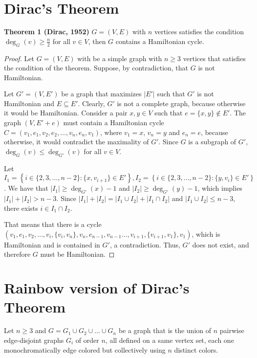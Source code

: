 \section{Dirac's Theorem}

\textbf{Theorem 1 (Dirac, 1952)} $G = (V, E)$ with $n$ vertices satisfies the condition $\deg_G(v) \geq \frac{n}{2}$ for all $v \in V$, 
then $G$ contains a Hamiltonian cycle.

\begin{proof}
    Let $G = (V, E)$ with be a simple graph with $n \geq 3$ vertices that satisfies the condition of the theorem. Suppose, 
    by contradiction, that $G$ is not Hamiltonian. 

    Let $G' = (V, E')$ be a graph that maximizes $|E'|$ such that $G'$ is not Hamiltonian and $E \subseteq E'$. 
    Clearly, $G'$ is not a complete graph, because otherwise it would be Hamiltonian. Consider a pair $x, y \in V$ such that 
    $e = \{x, y\} \not\in E'$.
    The graph $(V, E' + e)$ must contain a Hamiltonian cycle $C = (v_1, e_1, v_2, e_2, \ldots, v_n, e_{n}, v_1)$, where 
    $v_1 = x$, $v_n = y$ and $e_n = e$, because otherwise, it would contradict the maximality of $G'$.
    Since $G$ is a subgraph of $G'$, $\deg_G(v) \leq \deg_{G'}(v)$ for all $v \in V$.

    Let $I_1 = \left\{i \in \{2, 3, \dots, n-2\} : \{x, v_{i+1}\} \in E'\right\}, 
    I_2 = \left\{ i \in \{2, 3, \dots, n - 2\} : \{y, v_{i}\} \in E' \right\}$.
    We have that $|I_1| \geq \deg_{G'}(x) - 1$ and $|I_2| \geq \deg_{G'}(y) - 1$,
    which implies $|I_1| + |I_2| > n - 3$. 
    Since $|I_1| + |I_2| = |I_1 \cup I_2| + |I_1 \cap I_2|$ and $|I_1 \cup I_2| \leq n - 3$, 
    there exists $i \in I_1 \cap I_2$.

    That means that there is a cycle 
    $(v_1, e_1, v_2, \dots, v_i, \{v_i, v_n\}, v_n, e_{n - 1}, v_{n-1} \dots , v_{i+1}, \{v_{i+1}, v_1\}, v_1)$, 
    which is Hamiltonian and is contained in $G'$, a contradiction. Thus, $G'$ does not exist,
    and therefore $G$ must be Hamiltonian.

\end{proof}

\section{Rainbow version of Dirac's Theorem}

Let $n\geq 3$ and $G = G_1 \cup G_2 \cup \ldots \cup
G_n$ be a graph that is the union of $n$ pairwise edge-disjoint graphs
$G_i$ of order $n$, all defined on a same vertex set, each one
monochromatically edge colored but collectively using $n$ distinct
colors.